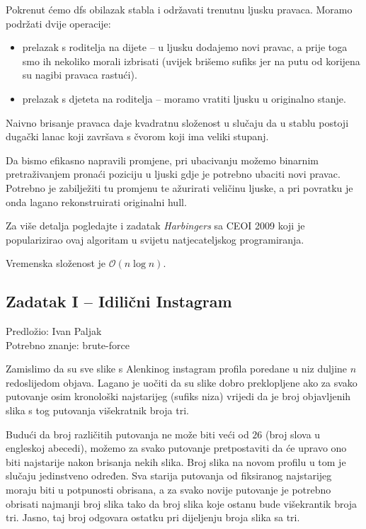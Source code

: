 \documentclass[a4paper]{article}
\begin{document}
Pokrenut ćemo dfs obilazak stabla i održavati trenutnu ljusku pravaca. Moramo
podržati dvije operacije:

\begin{itemize}
  \item prelazak s roditelja na dijete -- u ljusku dodajemo novi pravac, a prije
        toga smo ih nekoliko morali izbrisati (uvijek brišemo sufiks jer na putu
        od korijena su nagibi pravaca rastući).
  \item prelazak s djeteta na roditelja -- moramo vratiti ljusku u originalno stanje.
\end{itemize}

Naivno brisanje pravaca daje kvadratnu složenost u slučaju da u stablu postoji
dugački lanac koji završava s čvorom koji ima veliki stupanj.

Da bismo efikasno napravili promjene, pri ubacivanju možemo binarnim
pretraživanjem pronaći poziciju u ljuski gdje je potrebno ubaciti novi pravac.
Potrebno je zabilježiti tu promjenu te ažurirati veličinu ljuske, a pri povratku
je onda lagano rekonstruirati originalni hull.

Za više detalja pogledajte i zadatak \textit{Harbingers} sa CEOI 2009 koji je
popularizirao ovaj algoritam u svijetu natjecateljskog programiranja.

Vremenska složenost je $\mathcal{O}(n \log{}n)$.

\clearpage

\subsection*{Zadatak I -- Idilični Instagram}
\textsf{Predložio: Ivan Paljak}\\
\textsf{Potrebno znanje: brute-force}

Zamislimo da su sve slike s Alenkinog instagram profila poredane u niz duljine
$n$ redoslijedom objava. Lagano je uočiti da su slike dobro preklopljene ako za
svako putovanje osim kronološki najstarijeg (sufiks niza) vrijedi da je broj
objavljenih slika s tog putovanja višekratnik broja tri.

Budući da broj različitih putovanja ne može biti veći od $26$ (broj slova u
engleskoj abecedi), možemo za svako putovanje pretpostaviti da će upravo ono
biti najstarije nakon brisanja nekih slika. Broj slika na novom profilu u tom je
slučaju jedinstveno određen. Sva starija putovanja od fiksiranog najstarijeg
moraju biti u potpunosti obrisana, a za svako novije putovanje je potrebno
obrisati najmanji broj slika tako da broj slika koje ostanu bude višekrantik
broja tri. Jasno, taj broj odgovara ostatku pri dijeljenju broja slika sa tri.
\end{document}
